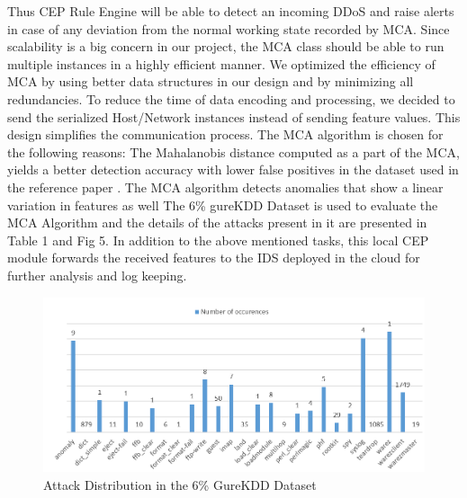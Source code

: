 \documentclass[conference]{sig-alternate-05-2015}
\begin{document}
\begin{itemize}
Thus CEP Rule Engine will be able to detect an incoming DDoS and raise alerts in case of any deviation from the normal working state recorded by MCA. Since scalability is a big concern in our project, the MCA class should be able to run multiple instances in a highly efficient manner. We optimized the efficiency of MCA by using better data structures in our design and by minimizing all redundancies. To reduce the time of data encoding and processing, we   decided   to   send   the serialized Host/Network instances \cite{javadoc1} instead of sending feature values. This design simplifies the communication process.
The MCA algorithm is chosen for the following reasons:
The Mahalanobis distance computed as a part of the MCA, yields a better detection accuracy with lower false positives in the dataset used in the reference paper \cite{javadoc2}.
The MCA algorithm detects anomalies that show a linear variation in features as well
The 6\% gureKDD Dataset \cite{gurekdd} is used to evaluate the MCA Algorithm and the details of the attacks present in it are presented in Table 1 and Fig 5. 
In addition to the above mentioned tasks, this local CEP module forwards the received features to the IDS deployed in the cloud for further analysis and log keeping.
\end{itemize}


\begin{figure}[t]
\caption{Attack Distribution in the 6\% GureKDD Dataset}
\includegraphics[width=\textwidth]{attack_dist}
\centering
\end{figure}
\end{document}
